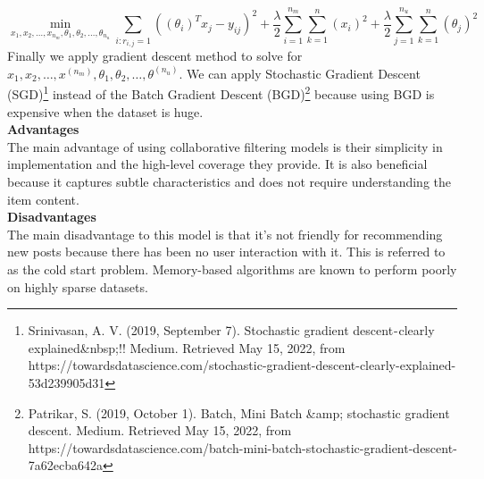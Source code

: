 \begin{equation*}
\min_{x_{1},x_{2}, \dots,x_{n_{m}}, \theta_{1},\theta_{2}, \dots, \theta_{n_{u}} } 
\sum_{i:r_{i,j} = 1}\left((\theta_{i})^{T}x_{j}-y_{ij}\right)^{2} + 
\frac{\lambda}{2}
\sum_{i=1}^{n_{m}}
\sum_{k = 1}^{n}(x_{i})^{2}+
\frac{\lambda}{2}
\sum_{j=1}^{n_{u}}
\sum_{k = 1}^{n}(\theta_{j})^{2}
\end{equation*}
Finally we apply gradient descent method to solve for $x_{1},x_{2}, \dots,x^{(n_{m})}, \theta_{1},\theta_{2}, \dots, \theta^{(n_{u})}$. We can apply Stochastic Gradient Descent (SGD)\footnote{Srinivasan, A. V. (2019, September 7). Stochastic gradient descent - clearly explained&nbsp;!! Medium. Retrieved May 15, 2022, from https://towardsdatascience.com/stochastic-gradient-descent-clearly-explained-53d239905d31 } instead of the Batch Gradient Descent (BGD)\footnote{Patrikar, S. (2019, October 1). Batch, Mini Batch &amp; stochastic gradient descent. Medium. Retrieved May 15, 2022, from https://towardsdatascience.com/batch-mini-batch-stochastic-gradient-descent-7a62ecba642a} because using BGD is expensive when the dataset is huge. 
\\\textbf{Advantages}
\\The main advantage of using collaborative filtering models is their simplicity in implementation and the high-level coverage they provide. It is also beneficial because it captures subtle characteristics and does not require understanding the item content.
\\ \textbf{Disadvantages}
\\The main disadvantage to this model is that it’s not friendly for recommending new posts because there has been no user interaction with it. This is referred to as the cold start problem. Memory-based algorithms are known to perform poorly on highly sparse datasets.


